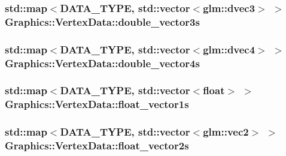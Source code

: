 \subsubsection[{double\+\_\+vector3s}]{\setlength{\rightskip}{0pt plus 5cm}std\+::map$<${\bf D\+A\+T\+A\+\_\+\+T\+Y\+P\+E}, std\+::vector$<$glm\+::dvec3$>$ $>$ Graphics\+::\+Vertex\+Data\+::double\+\_\+vector3s\hspace{0.3cm}{\ttfamily [private]}}\label{class_graphics_1_1_vertex_data_acd623a5856ffac27e3cd51b4202def6d}
\hypertarget{class_graphics_1_1_vertex_data_a1b65aafda38402e62d0b52d7822492d9}{}
\subsubsection[{double\+\_\+vector4s}]{\setlength{\rightskip}{0pt plus 5cm}std\+::map$<${\bf D\+A\+T\+A\+\_\+\+T\+Y\+P\+E}, std\+::vector$<$glm\+::dvec4$>$ $>$ Graphics\+::\+Vertex\+Data\+::double\+\_\+vector4s\hspace{0.3cm}{\ttfamily [private]}}\label{class_graphics_1_1_vertex_data_a1b65aafda38402e62d0b52d7822492d9}
\hypertarget{class_graphics_1_1_vertex_data_a8dd7ba1a6fd4ba256b8805a2efa5f086}{}
\subsubsection[{float\+\_\+vector1s}]{\setlength{\rightskip}{0pt plus 5cm}std\+::map$<${\bf D\+A\+T\+A\+\_\+\+T\+Y\+P\+E}, std\+::vector$<$float$>$ $>$ Graphics\+::\+Vertex\+Data\+::float\+\_\+vector1s\hspace{0.3cm}{\ttfamily [private]}}\label{class_graphics_1_1_vertex_data_a8dd7ba1a6fd4ba256b8805a2efa5f086}
\hypertarget{class_graphics_1_1_vertex_data_add262a2473187fe32842cfc13e4eb72f}{}
\subsubsection[{float\+\_\+vector2s}]{\setlength{\rightskip}{0pt plus 5cm}std\+::map$<${\bf D\+A\+T\+A\+\_\+\+T\+Y\+P\+E}, std\+::vector$<$glm\+::vec2$>$ $>$ Graphics\+::\+Vertex\+Data\+::float\+\_\+vector2s\hspace{0.3cm}{\ttfamily [private]}}\label{class_graphics_1_1_vertex_data_add262a2473187fe32842cfc13e4eb72f}
\hypertarget{class_graphics_1_1_vertex_data_a5d84c110b57a1c72bf871da376f8ef16}{}
